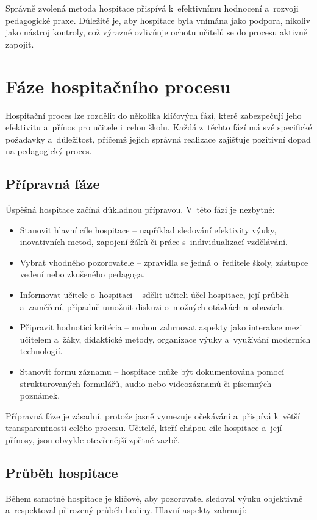 Správně zvolená metoda hospitace přispívá k~efektivnímu hodnocení a~rozvoji pedagogické praxe. Důležité je, aby hospitace byla vnímána jako podpora, nikoliv jako nástroj kontroly, což výrazně ovlivňuje ochotu učitelů se do procesu aktivně zapojit.


\section{Fáze hospitačního procesu}

Hospitační proces lze rozdělit do několika klíčových fází, které zabezpečují jeho efektivitu a~přínos pro učitele i~celou školu. Každá z~těchto fází má své specifické požadavky a~důležitost, přičemž jejich správná realizace zajišťuje pozitivní dopad na pedagogický proces.

\subsection{Přípravná fáze}

Úspěšná hospitace začíná důkladnou přípravou. V~této fázi je nezbytné:

\begin{itemize}
    \item Stanovit hlavní cíle hospitace – například sledování efektivity výuky, inovativních metod, zapojení žáků či práce s~individualizací vzdělávání.
    \item Vybrat vhodného pozorovatele – zpravidla se jedná o~ředitele školy, zástupce vedení nebo zkušeného pedagoga.
    \item Informovat učitele o~hospitaci – sdělit učiteli účel hospitace, její průběh a~zaměření, případně umožnit diskuzi o~možných otázkách a~obavách.
    \item Připravit hodnoticí kritéria – mohou zahrnovat aspekty jako interakce mezi učitelem a~žáky, didaktické metody, organizace výuky a~využívání moderních technologií.
    \item Stanovit formu záznamu – hospitace může být dokumentována pomocí strukturovaných formulářů, audio nebo videozáznamů či písemných poznámek.
\end{itemize}

Přípravná fáze je zásadní, protože jasně vymezuje očekávání a~přispívá k~větší transparentnosti celého procesu. Učitelé, kteří chápou cíle hospitace a~její přínosy, jsou obvykle otevřenější zpětné vazbě.

\subsection{Průběh hospitace}
Během samotné hospitace je klíčové, aby pozorovatel sledoval výuku objektivně a~respektoval přirozený průběh hodiny. Hlavní aspekty zahrnují:

